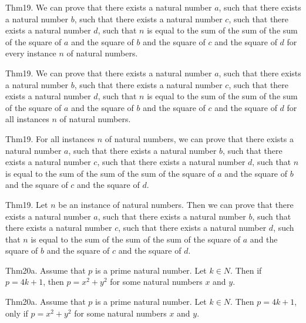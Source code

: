 \documentclass{article}
\begin{document}
Thm19. We can prove that there exists a natural number $a$, such that there exists a natural number $b$, such that there exists a natural number $c$, such that there exists a natural number $d$, such that $n$ is equal to the sum of the sum of the sum of the square of $a$ and the square of $b$ and the square of $c$ and the square of $d$ for every instance $n$ of natural numbers.

Thm19. We can prove that there exists a natural number $a$, such that there exists a natural number $b$, such that there exists a natural number $c$, such that there exists a natural number $d$, such that $n$ is equal to the sum of the sum of the sum of the square of $a$ and the square of $b$ and the square of $c$ and the square of $d$ for all instances $n$ of natural numbers.

Thm19. For all instances $n$ of natural numbers, we can prove that there exists a natural number $a$, such that there exists a natural number $b$, such that there exists a natural number $c$, such that there exists a natural number $d$, such that $n$ is equal to the sum of the sum of the sum of the square of $a$ and the square of $b$ and the square of $c$ and the square of $d$.

Thm19. Let $n$ be an instance of natural numbers. Then we can prove that there exists a natural number $a$, such that there exists a natural number $b$, such that there exists a natural number $c$, such that there exists a natural number $d$, such that $n$ is equal to the sum of the sum of the sum of the square of $a$ and the square of $b$ and the square of $c$ and the square of $d$.

Thm20a. Assume that $p$ is a prime natural number. Let $k \in N$. Then if $p = 4 k + 1$, then $p = x ^{ 2}+ y ^{ 2}$ for some natural numbers $x$ and $y$.

Thm20a. Assume that $p$ is a prime natural number. Let $k \in N$. Then $p = 4 k + 1$, only if $p = x ^{ 2}+ y ^{ 2}$ for some natural numbers $x$ and $y$.
\end{document}
